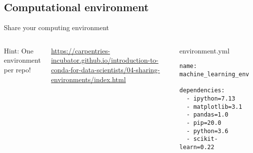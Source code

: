 \documentclass[10pt,aspectratio=169]{beamer} %
\begin{document}
\subsection{Computational environment}
\begin{frame}[fragile,label=frame31]{Share your computing environment}
\begin{columns}
Hint: One environment per repo!	\\
\vspace{5mm}

\url{https://carpentries-incubator.github.io/introduction-to-conda-for-data-scientists/04-sharing-environments/index.html}
\begin{block}{environment.yml}
\begin{verbatim}
name: machine_learning_env

dependencies:
  - ipython=7.13
  - matplotlib=3.1
  - pandas=1.0
  - pip=20.0
  - python=3.6
  - scikit-learn=0.22
\end{verbatim}
\end{block}
\end{columns}
\end{frame}
\end{document}
